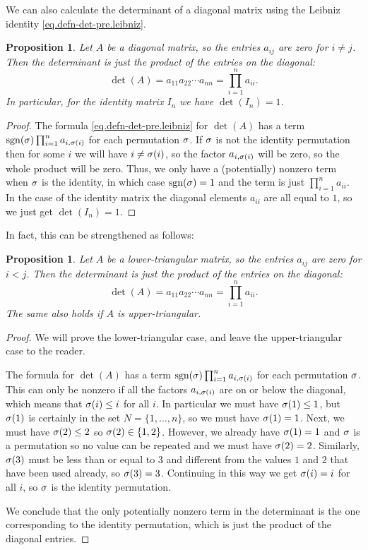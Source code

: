 \documentclass[reqno]{amsart}
\newtheorem{proposition}[theorem]{Proposition}
\theoremstyle{definition}
\begin{document}
We can also calculate the determinant of a diagonal matrix using
the Leibniz identity \eqref{eq.defn-det-pre.leibniz}.
\begin{proposition}\label{prop-det-diag}
 Let $A$ be a diagonal matrix, so the entries $a_{ij}$ are zero for
 $i\neq j$.  Then the determinant is just the product of the entries
 on the diagonal:
 \[ \det(A) = a_{11} a_{22} \dotsb a_{nn} = \prod_{i=1}^n a_{ii}. \]
 In particular, for the identity matrix $I_n$ we have $\det(I_n)=1$.
\end{proposition}
\begin{proof}
 The formula \eqref{eq.defn-det-pre.leibniz} for $\det(A)$ has a term
 $\operatorname{sgn}(\sigma)\prod_{i=1}^na_{i,\sigma(i)}$ for each permutation $\sigma$.  If
 $\sigma$ is not the identity permutation then for some $i$ we will have
 $i\neq\sigma(i)$, so the factor $a_{i,\sigma(i)}$ will be zero, so the
 whole product will be zero.  Thus, we only have a (potentially)
 nonzero term when $\sigma$ is the identity, in which case $\operatorname{sgn}(\sigma)=1$
 and the term is just $\prod_{i=1}^na_{ii}$.  In the case of the
 identity matrix the diagonal elements $a_{ii}$ are all equal to $1$,
 so we just get $\det(I_n)=1$.
\end{proof}

In fact, this can be strengthened as follows:
\begin{proposition}\label{prop-det-tri}
 Let $A$ be a lower-triangular matrix, so the entries $a_{ij}$ are
 zero for $i<j$.  Then the determinant is just the product of the entries
 on the diagonal:
 \[ \det(A) = a_{11} a_{22} \dotsb a_{nn} = \prod_{i=1}^n a_{ii}. \]
 The same also holds if $A$ is upper-triangular.
\end{proposition}
\begin{proof}
 We will prove the lower-triangular case, and leave the
 upper-triangular case to the reader.

 The formula for $\det(A)$ has a term
 $\operatorname{sgn}(\sigma)\prod_{i=1}^na_{i,\sigma(i)}$ for each permutation $\sigma$.
 This can only be nonzero if all the factors $a_{i,\sigma(i)}$ are on or
 below the diagonal, which means that $\sigma(i)\leq i$ for all $i$.  In
 particular we must have $\sigma(1)\leq 1$, but $\sigma(1)$ is certainly in
 the set $N=\{1,\dotsc,n\}$, so we must have $\sigma(1)=1$.  Next, we
 must have $\sigma(2)\leq 2$ so $\sigma(2)\in\{1,2\}$.  However, we already
 have $\sigma(1)=1$ and $\sigma$ is a permutation so no value can be
 repeated and we must have $\sigma(2)=2$.  Similarly, $\sigma(3)$ must be
 less than or equal to $3$ and different from the values $1$ and $2$
 that have been used already, so $\sigma(3)=3$.  Continuing in this way
 we get $\sigma(i)=i$ for all $i$, so $\sigma$ is the identity permutation.

 We conclude that the only potentially nonzero term in the determinant
 is the one corresponding to the identity permutation, which is just
 the product of the diagonal entries.
\end{proof}
\end{document}
